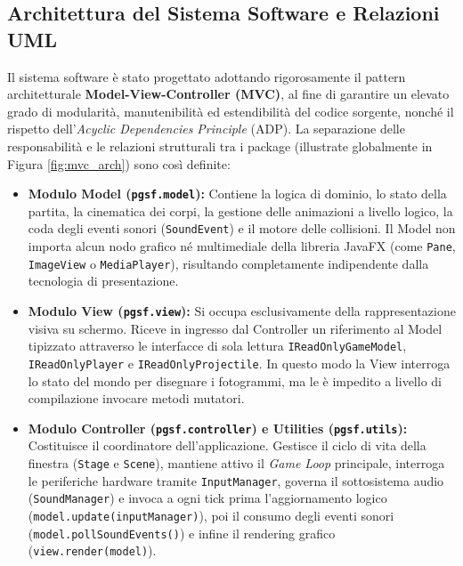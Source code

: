 \documentclass[11pt, a4paper]{article}
\begin{document}
\subsection{Architettura del Sistema Software e Relazioni UML}
Il sistema software è stato progettato adottando rigorosamente il pattern architetturale \textbf{Model-View-Controller (MVC)}, al fine di garantire un elevato grado di modularità, manutenibilità ed estendibilità del codice sorgente, nonché il rispetto dell'\emph{Acyclic Dependencies Principle} (ADP). La separazione delle responsabilità e le relazioni strutturali tra i package (illustrate globalmente in Figura \ref{fig:mvc_arch}) sono così definite:

\begin{itemize}
    \item \textbf{Modulo Model (\texttt{pgsf.model}):} Contiene la logica di dominio, lo stato della partita, la cinematica dei corpi, la gestione delle animazioni a livello logico, la coda degli eventi sonori (\texttt{SoundEvent}) e il motore delle collisioni. Il Model non importa alcun nodo grafico né multimediale della libreria JavaFX (come \texttt{Pane}, \texttt{ImageView} o \texttt{MediaPlayer}), risultando completamente indipendente dalla tecnologia di presentazione.
    \item \textbf{Modulo View (\texttt{pgsf.view}):} Si occupa esclusivamente della rappresentazione visiva su schermo. Riceve in ingresso dal Controller un riferimento al Model tipizzato attraverso le interfacce di sola lettura \texttt{IReadOnlyGameModel}, \texttt{IReadOnlyPlayer} e \texttt{IReadOnlyProjectile}. In questo modo la View interroga lo stato del mondo per disegnare i fotogrammi, ma le è impedito a livello di compilazione invocare metodi mutatori.
    \item \textbf{Modulo Controller (\texttt{pgsf.controller}) e Utilities (\texttt{pgsf.utils}):} Costituisce il coordinatore dell'applicazione. Gestisce il ciclo di vita della finestra (\texttt{Stage} e \texttt{Scene}), mantiene attivo il \emph{Game Loop} principale, interroga le periferiche hardware tramite \texttt{InputManager}, governa il sottosistema audio (\texttt{SoundManager}) e invoca a ogni tick prima l'aggiornamento logico (\texttt{model.update(inputManager)}), poi il consumo degli eventi sonori (\texttt{model.pollSoundEvents()}) e infine il rendering grafico (\texttt{view.render(model)}).
\end{itemize}
\end{document}
